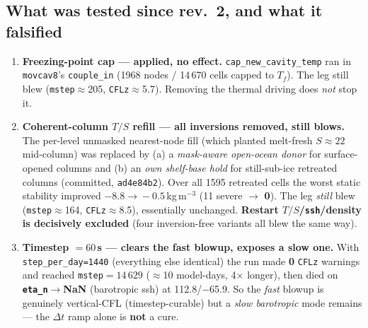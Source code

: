 \documentclass[11pt,a4paper]{article}
\newcommand{\code}[1]{\texttt{\small #1}}
\begin{document}
\subsection{What was tested since rev.~2, and what it falsified}
\begin{enumerate}[leftmargin=1.6em,itemsep=3pt]
  \item \textbf{Freezing-point cap --- applied, no effect.} \code{cap\_new\_cavity\_temp} ran in
        \code{movcav8}'s \code{couple\_in} (1968 nodes / 14\,670 cells capped to $T_f$). The leg
        still blew (\code{mstep}$\approx$205, \code{CFLz}$\approx$5.7). Removing the thermal
        driving does \emph{not} stop it.
  \item \textbf{Coherent-column $T/S$ refill --- all inversions removed, still blows.} The
        per-level unmasked nearest-node fill (which planted melt-fresh $S\approx22$ mid-column)
        was replaced by (a) a \emph{mask-aware open-ocean donor} for surface-opened columns and
        (b) an \emph{own shelf-base hold} for still-sub-ice retreated columns (committed,
        \code{ad4e84b2}). Over all 1595 retreated cells the worst static stability improved
        $-8.8\!\to\!-0.5$\,kg\,m$^{-3}$ (11 severe $\to$ \textbf{0}). The leg \emph{still} blew
        (\code{mstep}$\approx$164, \code{CFLz}$\approx$8.5), essentially unchanged.
        \textbf{Restart $T/S$/\code{ssh}/density is decisively excluded} (four inversion-free
        variants all blew the same way).
  \item \textbf{Timestep $=60$\,s --- clears the fast blowup, exposes a slow one.} With
        \code{step\_per\_day=1440} (everything else identical) the run made \textbf{0} \code{CFLz}
        warnings and reached \code{mstep}$=14\,629$ ($\approx$10 model-days, 4$\times$ longer),
        then died on \textbf{\code{eta\_n}$\to$NaN} (barotropic ssh) at 112.8/$-$65.9. So the
        \emph{fast} blowup is genuinely vertical-CFL (timestep-curable) but a \emph{slow
        barotropic} mode remains --- the $\Delta t$ ramp alone is \textbf{not} a cure.
\end{enumerate}
\end{document}
